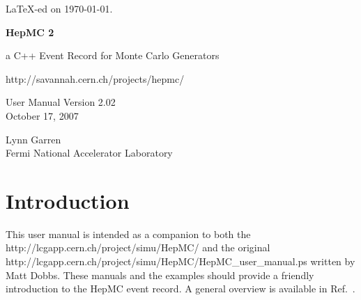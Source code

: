 \documentclass[11pt,letterpaper]{article}
\begin{document}
\newenvironment{fminipage}%
{\begin{Sbox}\begin{minipage}}%
{\end{minipage}\end{Sbox}\fbox{\TheSbox}}
%
%
%
\begin{titlepage}
{\tiny \LaTeX-ed on \today.}

\vspace{3cm}

\begin{center}

{\Huge\bf HepMC 2}

\vspace{1cm}

{\huge a C++ Event Record for Monte Carlo Generators }

\vspace{2cm}

{http://savannah.cern.ch/projects/hepmc/}

\vspace{0.5cm}

{\Large User Manual Version 2.02} \\
October 17, 2007

\vspace{2cm}

{\huge Lynn Garren} \\
Fermi National Accelerator Laboratory

\vspace{1cm}

\end{center}
\begin{abstract}
  HepMC 2 is an extension to the original HepMC written by Matt Dobbs.
  This manual is a companion to HepMC\_user\_manual.ps.
\end{abstract}
\end{titlepage}


%
%

\section{Introduction}
This user manual is intended as a companion to both the 
{http://lcgapp.cern.ch/project/simu/HepMC/} and the original
{http://lcgapp.cern.ch/project/simu/HepMC/HepMC\_user\_manual.ps}
written by Matt Dobbs. 
These manuals and the examples
should provide a friendly introduction to the HepMC event record. A
general overview is available in Ref.~\cite{dobbs:2000CompPhysComm}.
\end{document}
